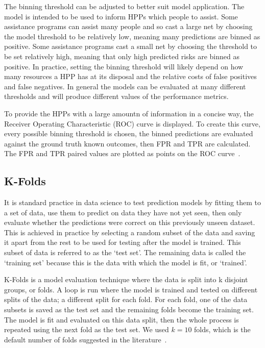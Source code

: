 \documentclass[10pt,letterpaper]{article}
\newcommand{\red}[1]{{\color{red}{#1}}}
\begin{document}
The binning threshold can be adjusted to better suit model application. The model is intended to be used to inform HPPs which people to assist. Some assistance programs can assist many people and so cast a large net by choosing the model threshold to be relatively low, meaning many predictions are binned as positive. Some assistance programs cast a small net by choosing the threshold to be set relatively high, meaning that only high predicted risks are binned as positive. In practice, setting the binning threshold will likely depend on how many resources a HPP has at its disposal and the relative costs of false positives and false negatives. In general the models can be evaluated at many different thresholds and will produce different values of the performance metrics.

To provide the HPPs with a large amountn of information in a concise way, the Receiver Operating Characteristic (ROC) curve is displayed. To create this curve, every possible binning threshold is chosen, the binned predictions are evaluated against the ground truth known outcomes, then FPR and TPR are calculated. The FPR and TPR paired values are plotted as points on the ROC curve~\cite{fawcett2006introduction}.

\subsection*{K-Folds}
It is standard practice in data science to test prediction models by fitting them to a set of data, use them to predict on data they have not yet seen, then only evaluate whether the predictions were correct on this previously unseen dataset. This is achieved in practice by selecting a random subset of the data and saving it apart from the rest to be used for testing after the model is trained. This subset of data is referred to as the `test set'. The remaining data is called the `training set' because this is the data with which the model is fit, or `trained'. \red{remove previous paragraph?}

K-Folds is a model evaluation technique where the data is split into k disjoint groups, or folds. A loop is run where the model is trained and tested on different splits of the data; a different split for each fold. For each fold, one of the data subsets is saved as the test set and the remaining folds become the training set. The model is fit and evaluated on this data split, then the whole process is repeated using the next fold as the test set. We used $k = 10$ folds, which is the default number of folds suggested in the literature~\cite{marcot2020optimal}.
\end{document}

